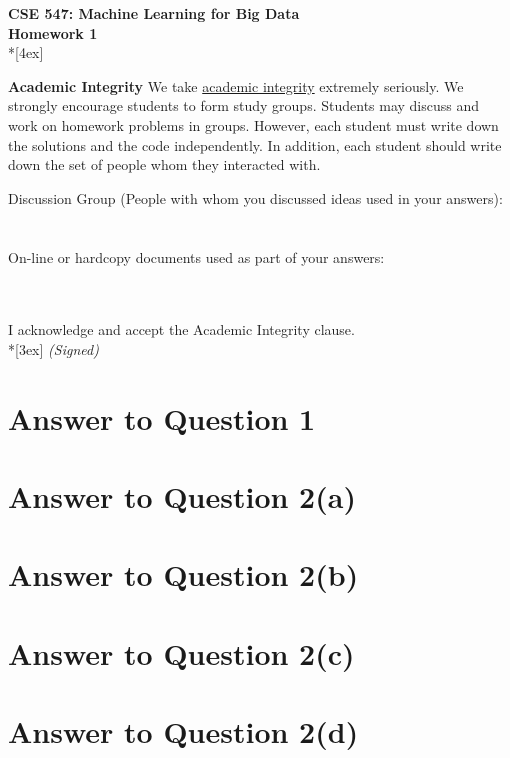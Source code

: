 \documentclass[11pt]{article}
\begin{document}
\thispagestyle{empty}
\parindent 0pt
\vfill
\large

\begin{center}
\LARGE{\bf \textsf{CSE 547: Machine Learning for Big Data}}\\ {\bf \textsf{Homework 1}} 
\\*[4ex]
\end{center}

\textbf{Academic Integrity} We take \href{https://www.cs.washington.edu/academics/misconduct}{academic integrity} extremely seriously. 
We strongly encourage students to form study groups. Students may discuss and work on homework problems in groups. However, each student must write down the solutions and the code independently. In addition, each student should write down the set of people whom they interacted with. 
\bigskip

Discussion Group (People with whom you discussed ideas used in your answers): \\\\\\
\vfill
On-line or hardcopy documents used as part of your answers: \\\\\\

\vfill

I acknowledge and accept the Academic Integrity clause.\\*[3ex]
\bigskip
\textit{(Signed)}\hrulefill

\pagebreak[4]
\section*{Answer to Question 1}

\pagebreak[4]
\section*{Answer to Question 2(a)}

\pagebreak[4]
\section*{Answer to Question 2(b)}

\pagebreak[4]
\section*{Answer to Question 2(c)}

\pagebreak[4]
\section*{Answer to Question 2(d)}
\end{document}
